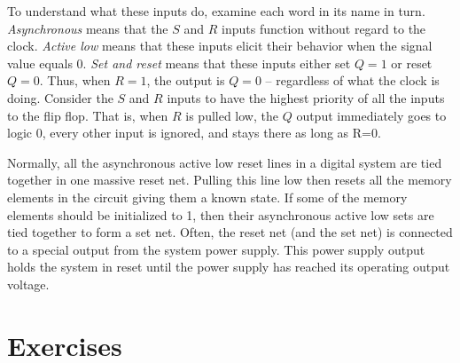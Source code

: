To understand what these inputs do, examine each word in its
name in turn.  {\it Asynchronous} means that the $S$ and $R$ inputs 
function without regard to the clock.  {\it Active low} means that these 
inputs elicit their behavior when the signal value equals 0.  {\it Set 
and reset} means that these inputs either set $Q=1$ or reset $Q=0$.
Thus, when $R=1$, the output is $Q=0$ -- regardless of what the clock is doing.
Consider the $S$ and $R$ inputs to have the highest priority 
of all the inputs to the flip flop.  That is, when $R$ is pulled 
low, the $Q$ output immediately goes to logic 0, every other input
is ignored, and stays there as long as R=0.  

Normally, all the asynchronous active low reset lines in a digital
system are tied together in one massive reset net.  Pulling this
line low then resets all the memory elements in the circuit giving
them a known state.  If some of the memory elements should be
initialized to 1, then their asynchronous active low sets are tied
together to form a set net.  Often, the reset net (and the set net)
is connected to a special output from the system power supply.  This
power supply output holds the system in reset until the power 
supply has reached its operating output voltage.

\section{Exercises}


